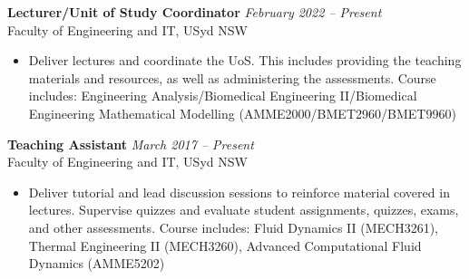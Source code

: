 \documentclass[letterpaper, 10pt]{article}
\newenvironment{changemargin}[2]{%
  \begin{list}{}{%
      \setlength{\topsep}{0pt}%
      \setlength{\leftmargin}{#1}%
      \setlength{\rightmargin}{#2}%
      \setlength{\listparindent}{\parindent}%
      \setlength{\itemindent}{\parindent}%
      \setlength{\parsep}{\parskip}%
    }%
  \item[]}{\end{list}
}
\newenvironment{body} {
  \vspace*{-16pt}
  \begin{changemargin}{-0.25in}{-0.5in}
  }
  {\end{changemargin}
}
\begin{document}
\begin{body}
	\vspace{14pt}
	\textbf{Lecturer/Unit of Study Coordinator} \hfill \emph{February 2022 -- Present}\\
Faculty of Engineering and IT, USyd \hfill NSW
\vspace{-2pt}
\begin{itemize}
	\setlength{\itemindent}{0in}
	\setlength{\itemsep}{0in}
	\item Deliver lectures and coordinate the UoS. This includes providing the teaching materials and resources, as well as administering the assessments.
	Course includes: Engineering Analysis/Biomedical Engineering II/Biomedical Engineering Mathematical Modelling (AMME2000/BMET2960/BMET9960)
\end{itemize}

\smallskip

	\textbf{Teaching Assistant} \hfill \emph{March 2017 -- Present}\\
Faculty of Engineering and IT, USyd \hfill NSW
\vspace{-2pt}
\begin{itemize}
	\setlength{\itemindent}{0in}
	\setlength{\itemsep}{0in}
	\item Deliver tutorial and lead discussion sessions to reinforce material covered in
	lectures. Supervise quizzes and evaluate student assignments, quizzes, exams, and other assessments.
	Course includes: Fluid Dynamics II (MECH3261), Thermal Engineering II (MECH3260), Advanced Computational Fluid Dynamics (AMME5202)
\end{itemize}
\end{body}
\smallskip

\end{document}
